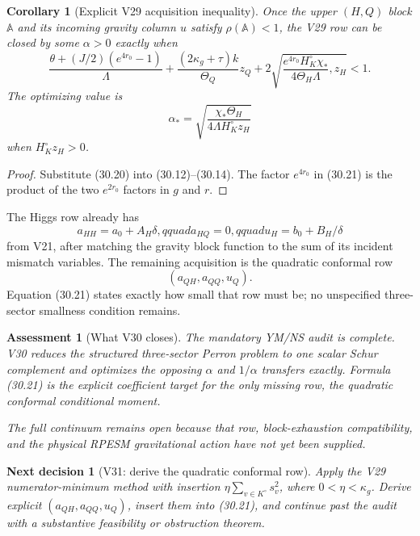 \documentclass[11pt]{article}
\newtheorem{corollary}[theorem]{Corollary}
\newtheorem{decision}[theorem]{Next decision}
\newtheorem{assessment}[theorem]{Assessment}
\theoremstyle{remark}
\begin{document}
\begin{corollary}[Explicit V29 acquisition inequality]
\label{cor:v17v30-acquisition}
Once the upper \((H,Q)\) block \(\mathbb A\) and its incoming gravity
column \(u\) satisfy \(\rho(\mathbb A)<1\), the V29 row can be closed
by some \(\alpha>0\) exactly when
\[
\boxed{
 \frac{\theta+(J/2)(e^{4r_0}-1)}{\Lambda}
 +\frac{(2\kappa_g+\tau)k}{\Theta_Q}z_Q
 +2\sqrt{
 \frac{e^{4r_0}H_K^\circ\chi_*}
 {4\Theta_H\Lambda},z_H}
 <1.}                                              \tag{30.21}
\]
The optimizing value is
\[
 \boxed{
 \alpha_*
 =\sqrt{
 \frac{\chi_*\Theta_H}
 {4\Lambda H_K^\circ z_H}}}                       \tag{30.22}
\]
when \(H_K^\circ z_H>0\).
\end{corollary}

\begin{proof}
Substitute (30.20) into (30.12)--(30.14).  The factor
\(e^{4r_0}\) in (30.21) is the product of the two
\(e^{2r_0}\) factors in \(g\) and \(r\).
\end{proof}

The Higgs row already has
\[
 a_{HH}=a_0+A_H\delta,qquad
 a_{HQ}=0,qquad
 u_H=b_0+B_H/\delta                                \tag{30.23}
\]
from V21, after matching the gravity block function to the sum of its
incident mismatch variables.  The remaining acquisition is the
quadratic conformal row
\[
 (a_{QH},a_{QQ},u_Q).                              \tag{30.24}
\]
Equation (30.21) states exactly how small that row must be; no
unspecified three-sector smallness condition remains.

\begin{assessment}[What V30 closes]
\label{ass:v17v30-status}
The mandatory YM/NS audit is complete.  V30 reduces the structured
three-sector Perron problem to one scalar Schur complement and optimizes
the opposing \(\alpha\) and \(1/\alpha\) transfers exactly.  Formula
(30.21) is the explicit coefficient target for the only missing row,
the quadratic conformal conditional moment.

The full continuum remains open because that row, block-exhaustion
compatibility, and the physical RPESM gravitational action have not yet
been supplied.
\end{assessment}

\begin{decision}[V31: derive the quadratic conformal row]
\label{dec:v17v30-next}
Apply the V29 numerator-minimum method with insertion
\(\eta\sum_{v\in K^\circ}s_v^2\), where
\(0<\eta<\kappa_g\).  Derive explicit
\((a_{QH},a_{QQ},u_Q)\), insert them into (30.21), and continue past the
audit with a substantive feasibility or obstruction theorem.
\end{decision}
\end{document}
